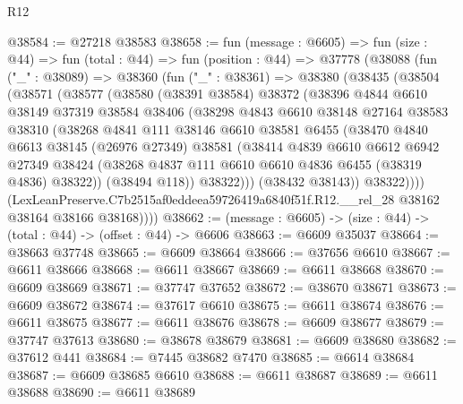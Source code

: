 \begin{lexlean}{R12}
\begin{coremodule}
@38584 := @27218 @38583
@38658 := fun (message : @6605) =>
  fun (size : @44) =>
  fun (total : @44) =>
  fun (position : @44) =>
  @37778
    (@38088
      (fun ("_" : @38089) =>
      @38360
        (fun ("_" : @38361) =>
        @38380
          (@38435
            (@38504
              (@38571
                (@38577
                  (@38580
                    (@38391 @38584)
                    @38372
                    (@38396
                      @4844
                      @6610
                      @38149
                      @37319
                      @38584
                      @38406
                      (@38298
                        @4843
                        @6610
                        @38148
                        @27164
                        @38583
                        @38310
                        (@38268
                          @4841
                          @111
                          @38146
                          @6610
                          @38581
                          @6455
                          (@38470
                            @4840
                            @6613
                            @38145
                            (@26976 @27349)
                            @38581
                            (@38414
                              @4839
                              @6610
                              @6612
                              @6942
                              @27349
                              @38424
                              (@38268 @4837 @111 @6610 @6610 @4836 @6455 (@38319 @4836) @38322))
                            (@38494 @118))
                          @38322)))
                    (@38432 @38143))
                  @38322))))
          (LexLeanPreserve.C7b2515af0eddeea59726419a6840f51f.R12.__rel_28
            @38162
            @38164
            @38166
            @38168))))
@38662 := (message : @6605) -> (size : @44) -> (total : @44) -> (offset : @44) -> @6606
@38663 := @6609 @35037
@38664 := @38663 @37748
@38665 := @6609 @38664
@38666 := @37656 @6610
@38667 := @6611 @38666
@38668 := @6611 @38667
@38669 := @6611 @38668
@38670 := @6609 @38669
@38671 := @37747 @37652
@38672 := @38670 @38671
@38673 := @6609 @38672
@38674 := @37617 @6610
@38675 := @6611 @38674
@38676 := @6611 @38675
@38677 := @6611 @38676
@38678 := @6609 @38677
@38679 := @37747 @37613
@38680 := @38678 @38679
@38681 := @6609 @38680
@38682 := @37612 @441
@38684 := @7445 @38682 @7470
@38685 := @6614 @38684
@38687 := @6609 @38685 @6610
@38688 := @6611 @38687
@38689 := @6611 @38688
@38690 := @6611 @38689

\end{coremodule}
\end{lexlean}
